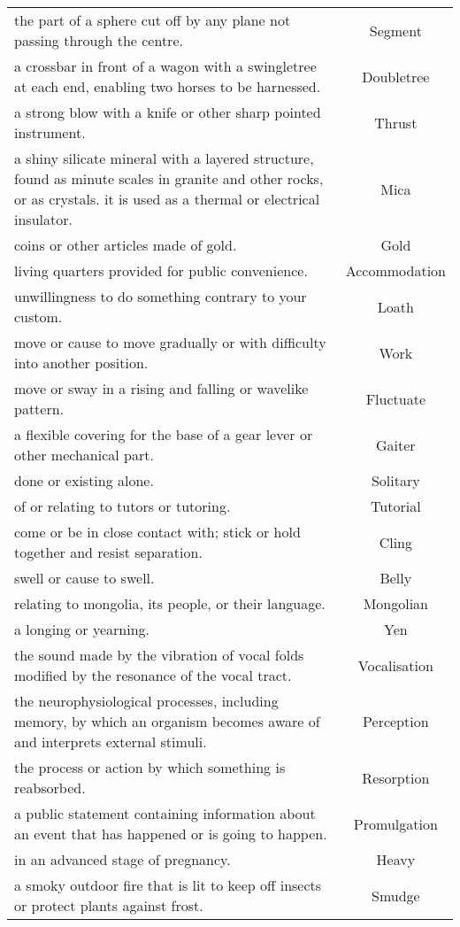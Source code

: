 \documentclass{article}
\begin{document}
\begin{longtable}{p{12cm}c}
the part of a sphere cut off by any plane not passing through the centre. & Segment\\
a crossbar in front of a wagon with a swingletree at each end, enabling two horses to be harnessed. & Doubletree\\
a strong blow with a knife or other sharp pointed instrument. & Thrust\\
a shiny silicate mineral with a layered structure, found as minute scales in granite and other rocks, or as crystals. it is used as a thermal or electrical insulator. & Mica\\
coins or other articles made of gold. & Gold\\
living quarters provided for public convenience. & Accommodation\\
unwillingness to do something contrary to your custom. & Loath\\
move or cause to move gradually or with difficulty into another position. & Work\\
move or sway in a rising and falling or wavelike pattern. & Fluctuate\\
a flexible covering for the base of a gear lever or other mechanical part. & Gaiter\\
done or existing alone. & Solitary\\
of or relating to tutors or tutoring. & Tutorial\\
come or be in close contact with; stick or hold together and resist separation. & Cling\\
swell or cause to swell. & Belly\\
relating to mongolia, its people, or their language. & Mongolian\\
a longing or yearning. & Yen\\
the sound made by the vibration of vocal folds modified by the resonance of the vocal tract. & Vocalisation\\
the neurophysiological processes, including memory, by which an organism becomes aware of and interprets external stimuli. & Perception\\
the process or action by which something is reabsorbed. & Resorption\\
a public statement containing information about an event that has happened or is going to happen. & Promulgation\\
in an advanced stage of pregnancy. & Heavy\\
a smoky outdoor fire that is lit to keep off insects or protect plants against frost. & Smudge\\

\end{longtable}
\end{document}
